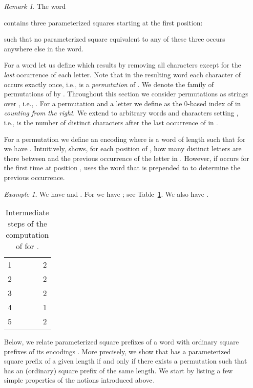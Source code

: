 \documentclass{article}
\theoremstyle{plain}
\theoremstyle{definition}
\theoremstyle{remark}
\newtheorem{remark}[theorem]{Remark}
\newtheorem{example}[theorem]{Example}
\begin{document}
  \begin{remark}
   The word
    
    contains three parameterized squares starting at the first position:
    
    such that no parameterized square equivalent to any of these three occurs anywhere else in the word.
  \end{remark}
  
  For a word  let us define  which results by removing all characters
  except for the \emph{last} occurrence of each letter. Note that in the resulting word
  each character of  occurs exactly once, i.e.,  is a \emph{permutation} of .
  We denote the family of permutations of  by .
  Throughout this section we consider permutations as strings over , i.e., .
  For a permutation  and a letter  we define  as the 0-based index of  in 
  \emph{counting from the right}. We extend  to arbitrary words  and characters  setting ,
  i.e.,  is the number of distinct characters after the last occurrence of  in .
  
  For a permutation  we define an encoding
   where  is a word  of length 
  such that for  we have .
  Intuitively,  shows, for each position  of , how many distinct letters are there between
   and the previous occurrence of the letter  in .
  However, if  occurs for the first time at position ,  uses the word 
  that is prepended to  to determine the previous occurrence.
  
\begin{example}
We have  and .
For  we have
; see Table~\ref{tab:1}. We also have .

\begin{table}[h]
  \begin{center}
    \caption{Intermediate steps of the computation of  for .}\label{tab:1}
    \footnotesize  
  \begin{tabular}{c|c|c|c|c}
     &  &  &  & \\\hline
      1 &  &  &  & 2 \\
      2 &  &  &  & 2 \\
      3 &  &  &  & 2 \\
      4 &  &  &  & 1 \\
      5 &  &  &  & 2 
  \end{tabular}
\end{center}
\end{table}
\end{example}

Below, we relate parameterized square prefixes of a word  with ordinary square prefixes of its encodings .
More precisely, we show that 
has a parameterized square prefix of a given length if and only if there exists a permutation  such that  has an (ordinary) square prefix of the same length. We start by listing a few simple properties of the notions introduced above.
\end{document}
